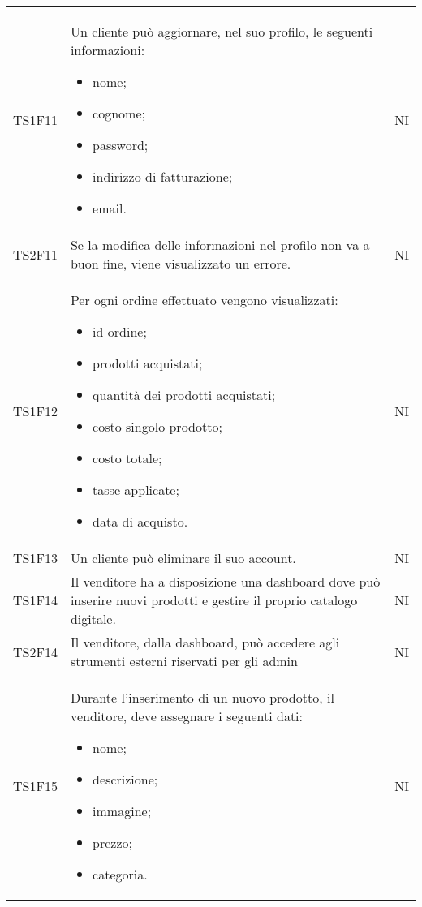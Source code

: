 {\begin{longtable}{C{3cm} C{10.2cm} C{1.5cm}}
TS1F11 & Un cliente può aggiornare, nel suo profilo, le seguenti informazioni:
\begin{itemize}
	\item nome;
	\item cognome;
	\item password;
	\item indirizzo di fatturazione;
	\item email.
\end{itemize}
& NI\\

TS2F11 & Se la modifica delle informazioni nel profilo non va a buon fine, viene visualizzato un errore.& NI\\

TS1F12 & Per ogni ordine effettuato vengono visualizzati:
\begin{itemize}
	\item id ordine;
	\item prodotti acquistati;
	\item quantità dei prodotti acquistati;
	\item costo singolo prodotto;
	\item costo totale;
	\item tasse applicate;
	\item data di acquisto.
\end{itemize}
& NI\\

TS1F13 & Un cliente può eliminare il suo account. & NI\\

TS1F14 & Il venditore ha a disposizione una dashboard dove può inserire nuovi prodotti e gestire il proprio catalogo digitale. & NI\\

TS2F14 & Il venditore, dalla dashboard, può accedere agli strumenti esterni riservati per gli admin  & NI\\

TS1F15 & Durante l'inserimento di un nuovo prodotto, il venditore, deve assegnare i seguenti dati:
\begin{itemize}
	\item nome;
	\item descrizione;
	\item immagine;
	\item prezzo;
	\item categoria.
\end{itemize} & NI\\


\end{longtable}}
